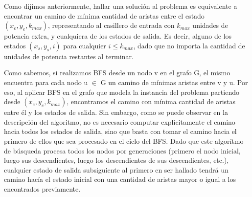 Como dijimos anteriormente, hallar una solución al problema es equivalente a encontrar un camino de mínima cantidad de aristas entre el estado $(x_e,y_e,k_{max})$, representando al casillero de entrada con $k_{max}$ unidades de potencia extra, y cualquiera de los estados de salida. Es decir, alguno de los estados $(x_s,y_s,i)$ para cualquier $i \leq k_{max}$, dado que no importa la cantidad de unidades de potencia restantes al terminar.

Como sabemos, si realizamos BFS desde un nodo v en el grafo G, el mismo encuentra para cada nodo u $\in$ G un camino de mínimas aristas entre v y u. Por eso, al aplicar BFS en el grafo que modela la instancia del problema partiendo desde $(x_e,y_e,k_{max})$, encontramos el camino con mínima cantidad de aristas entre él y los estados de salida. Sin embargo, como se puede observar en la descripción del algoritmo, no es necesario computar explícitamente el camino hacia todos los estados de salida, sino que basta con tomar el camino hacia el primero de ellos que sea procesado en el ciclo del BFS. Dado que este algorítmo de búsqueda procesa todos los nodos por generaciones (primero el nodo inicial, luego sus descendientes, luego los descendientes de sus descendientes, etc.), cualquier estado de salida subsiguiente al primero en ser hallado tendrá un camino hacía el estado inicial con una cantidad de aristas mayor o igual a los encontrados previamente.
